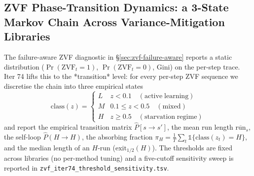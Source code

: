 
\subsection{ZVF Phase-Transition Dynamics: a 3-State Markov Chain Across Variance-Mitigation Libraries}
\label{sec:zvf-markov}

The failure-aware ZVF diagnostic in
\S\ref{sec:zvf-failure-aware} reports a static distribution
($\Pr(\mathrm{ZVF}_t = 1)$, $\Pr(\mathrm{ZVF}_t = 0)$, Gini) on the
per-step trace. Iter 74 lifts this to the *transition* level: for
every per-step ZVF sequence we discretise the chain into three
empirical states
%
\begin{equation}
  \mathrm{class}(z) = \begin{cases}
    L & z < 0.1\quad(\mathrm{active\;learning}) \\
    M & 0.1 \le z < 0.5 \quad(\mathrm{mixed}) \\
    H & z \ge 0.5 \quad(\mathrm{starvation\;regime})
  \end{cases}
  \label{eq:zvf-iter74-class}
\end{equation}
%
and report the empirical transition matrix $\hat P[s \to s']$, the
mean run length $\overline{\mathrm{run}}_s$, the self-loop
$\hat P(H \to H)$, the absorbing fraction
$\pi_H = \tfrac{1}{T}\sum_t \mathbb{1}\{\mathrm{class}(z_t) = H\}$,
and the median length of an $H$-run ($\mathrm{exit_{1/2}}(H)$).
The thresholds are fixed across libraries (no per-method tuning)
and a five-cutoff sensitivity sweep is reported in
\texttt{zvf\_iter74\_threshold\_sensitivity.tsv}.

